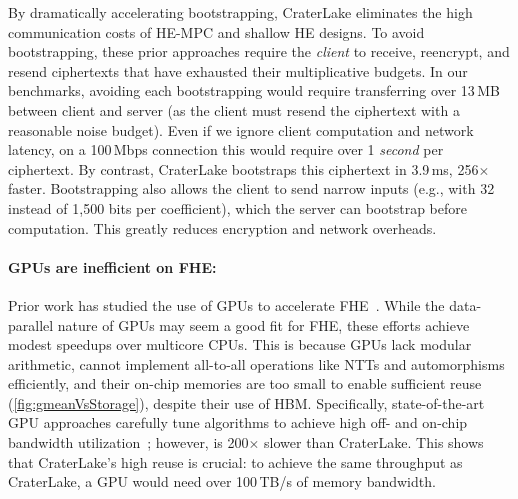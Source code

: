 By dramatically accelerating bootstrapping, CraterLake eliminates the high
communication costs of HE-MPC and shallow HE designs. To avoid bootstrapping,
these prior approaches require the \emph{client} to receive, reencrypt, and
resend ciphertexts that have exhausted their multiplicative budgets. In our
benchmarks, avoiding each bootstrapping would require transferring over 13\,MB
between client and server (as the client must resend the ciphertext with a
reasonable noise budget). Even if we ignore client computation and network
latency, on a 100\,Mbps connection this would require over 1 \emph{second} per
ciphertext. By contrast, CraterLake bootstraps this ciphertext in 3.9\,ms,
256$\times$ faster. Bootstrapping also allows the client to send narrow inputs
(e.g., with 32 instead of 1,500 bits per coefficient), which the server can
bootstrap before computation. This greatly reduces encryption and network
overheads.

\paragraph{GPUs are inefficient on FHE:}
Prior work has studied the use of GPUs to accelerate
FHE~\cite{wang:hpec12:fhe-gpu,wang:tc13:fhe-gpu,wang:iscas14:leveled-gpu,al:emerging19:implementation,jung2021over}.
While the data-parallel nature of GPUs may seem a good fit for FHE, these
efforts achieve modest speedups over multicore CPUs. This is because GPUs lack
modular arithmetic, cannot implement all-to-all operations like NTTs and
automorphisms efficiently, and their on-chip memories are too small to enable
sufficient reuse (\autoref{fig:gmeanVsStorage}), despite their use of HBM.
Specifically, state-of-the-art GPU approaches carefully tune algorithms to
achieve high off- and on-chip bandwidth utilization~\cite{jung2021over};
however, \cite{jung2021over} is 200$\times$ slower than CraterLake. This shows that
CraterLake's high reuse is crucial: to achieve the same throughput as CraterLake, a GPU
would need over 100\,TB/s of memory bandwidth.
